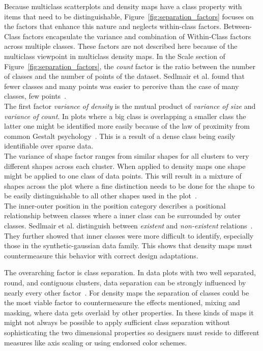 Because multiclass scatterplots and density maps have a class property with items that need to be distinguishable, Figure~\ref{fig:separation_factors} focuses on the factors that enhance this nature and neglects within-class factors. Between-Class factors encapsulate the variance and combination of Within-Class factors across multiple classes. These factors are not described here because of the multiclass viewpoint in multiclass density maps. In the Scale section of Figure~\ref{fig:separation_factors}, the \textit{count} factor is the ratio between the number of classes and the number of points of the dataset. Sedlmair et al. found that fewer classes and many points was easier to perceive than the case of many classes, few points~\cite{sedlmair2012taxonomy}. \\
The first factor \textit{variance of density} is the mutual product of \textit{variance of size} and \textit{variance of count}. In plots where a big class is overlapping a smaller class the latter one might be identified more easily because of the law of proximity from common Gestalt psychology~\cite{kim2008object}. This is a result of a dense class being easily identifiable over sparse data.\\
The variance of shape factor ranges from similar shapes for all clusters to very different shapes across each cluster. When applied to density maps one shape might be applied to one class of data points. This will result in a mixture of shapes across the plot where a fine distinction needs to be done for the shape to be easily distinguishable to all other shapes used in the plot~\cite{borgo2013glyph, demiralp2014learning}.\\
The inner-outer position in the position category describes a positional relationship between classes where a inner class can be surrounded by outer classes. Sedlmair et al. distinguish between \textit{existent} and \textit{non-existent} relations~\cite{sedlmair2012taxonomy}. They further showed that inner classes were more difficult to identify, especially those in the synthetic-gaussian data family. This shows that density maps must countermeasure this behavior with correct design adaptations.

The overarching factor is class separation. In data plots with two well separated, round, and contiguous clusters, data separation can be strongly influenced by nearly every other factor~\cite{sedlmair2012taxonomy}. For density maps the separation of classes could be the most viable factor to countermeasure the effects mentioned, mixing and masking, where data gets overlaid by other properties. In these kinds of maps it might not always be possible to apply sufficient class separation without sophisticating the two dimensional properties so designers must reside to different measures like axis scaling or using endorsed color schemes.

